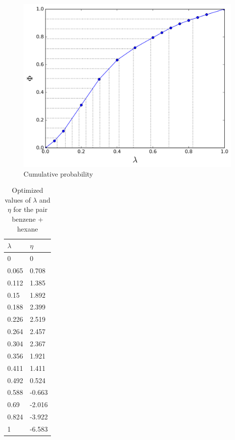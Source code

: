 \begin{figure}[h]
\centering
\includegraphics[width=0.7\linewidth]{Figures/optimized_cdf}
\caption{Cumulative probability}
\label{fig:optimized_cdf}
\end{figure}

\begin{table}[h]
	\centering
	\caption{Optimized values of $\lambda$ and $\eta$ for the pair benzene + hexane}
	  \label{tbl:lambdahex}
	\begin{tabular}{ll}
		\hline
        $\lambda$	&	$\eta$\\ 
        \hline		
        0	&	0\\ 
        0.065	&	0.708\\ 
        0.112	&	1.385\\ 
        0.15	&	1.892 \\ 
        0.188	&	2.399\\ 
        0.226	&	2.519\\ 
        0.264	&	2.457\\ 
        0.304	&	2.367\\ 
        0.356	&	1.921\\ 
        0.411	&	1.411\\ 
        0.492	&	0.524\\ 
        0.588	&	-0.663\\ 
        0.69	&	-2.016 \\ 
        0.824	&	-3.922\\ 
        1	    &	-6.583\\ 	
		\hline
	\end{tabular}
\end{table}

